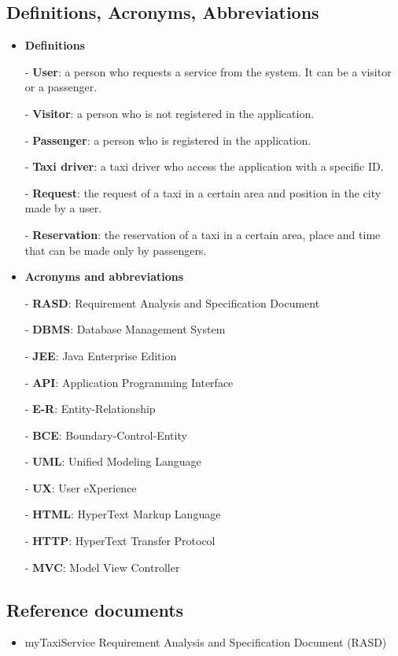 \documentclass[18pt,oneside,a4paper, titlepage]{article}
\begin{document}
	\subsection{Definitions, Acronyms, Abbreviations}
		\begin{itemize}
			\item \textbf{Definitions}
				\item[-] \textbf{User}: a person who requests a service from the system. It can be a visitor or a passenger.
				\item[-] \textbf{Visitor}: a person who is not registered in the application.
				\item[-] \textbf{Passenger}: a person who is registered in the application.
				\item[-] \textbf{Taxi driver}: a taxi driver who access the application with a specific ID.
				\item[-] \textbf{Request}: the request of a taxi in a certain area and position in the city made by a user.
				\item[-] \textbf{Reservation}: the reservation of a taxi in a certain area, place and time that can be made only by passengers.
			\item \textbf{Acronyms and abbreviations}
				\item[-] \textbf{RASD}: Requirement Analysis and Specification Document
				\item[-] \textbf{DBMS}: Database Management System
				\item[-] \textbf{JEE}: Java Enterprise Edition
				\item[-] \textbf{API}: Application Programming Interface
				\item[-] \textbf{E-R}: Entity-Relationship
				\item[-] \textbf{BCE}: Boundary-Control-Entity
				\item[-] \textbf{UML}: Unified Modeling Language
				\item[-] \textbf{UX}: User eXperience
				\item[-] \textbf{HTML}: HyperText Markup Language
				\item[-] \textbf{HTTP}: HyperText Transfer Protocol
				\item[-] \textbf{MVC}: Model View Controller
			
		\end{itemize}
	\subsection{Reference documents}
		\begin{itemize}
			\item myTaxiService Requirement Analysis and Specification Document (RASD)
		\end{itemize}
\end{document}
